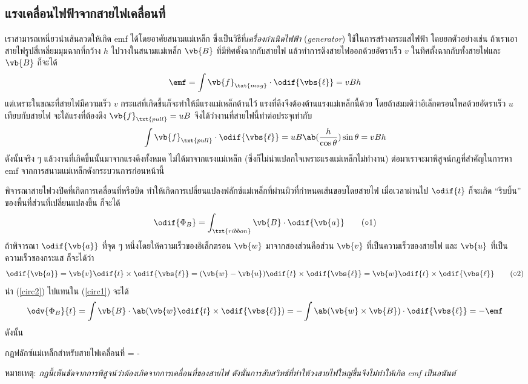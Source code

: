 \subsection{แรงเคลื่อนไฟฟ้าจากสายไฟเคลื่อนที่}

เราสามารถเหนี่ยวนำเส้นลวดให้เกิด emf ได้โดยอาศัยสนามแม่เหล็ก ซึ่งเป็นวิธีที่\emph{เครื่องกำเนิดไฟฟ้า} (\emph{generator}) ใช้ในการสร้างกระแสไฟฟ้า โดยยกตัวอย่างเช่น ถ้าเราเอาสายไฟรูปสี่เหลี่ยมมุมฉากที่กว้าง $h$ ไปวางในสนามแม่เหล็ก $\vb{B}$ ที่มีทิศตั้งฉากกับสายไฟ แล้วทำการดึงสายไฟออกด้วยอัตราเร็ว $v$ ในทิศตั้งฉากกับทั้งสายไฟและ $\vb{B}$ ก็จะได้
\[ 
\emf = \int \vb{f}_\txt{mag}\cdot\odif{\vbs{\ell}} = vBh 
\]
แต่เพราะในขณะที่สายไฟมีความเร็ว $v$ กระแสที่เกิดขึ้นก็จะทำให้มีแรงแม่เหล็กต้านไว้ แรงที่ดึงจึงต้องต้านแรงแม่เหล็กนี้ด้วย โดยถ้าสมมติว่าอิเล็กตรอนไหลด้วยอัตราเร็ว $u$ เทียบกับสายไฟ จะได้แรงที่ต้องดึง $\vb{f}_\txt{pull} = uB$ จึงได้ว่างานที่สายไฟนี้ทำต่อประจุเท่ากับ
\[ 
\int \vb{f}_\txt{pull}\cdot\odif{\vbs{\ell}} = uB\ab(\frac{h}{\cos\theta})\sin\theta = vBh 
\]
ดังนั้นจริง ๆ แล้วงานที่เกิดขึ้นนั้นมาจากแรงดึงทั้งหมด ไม่ได้มาจากแรงแม่เหล็ก (ซึ่งก็ไม่น่าแปลกใจเพราะแรงแม่เหล็กไม่ทำงาน) ต่อมาเราจะมาพิสูจน์กฎที่สำคัญในการหา emf จากการสนามแม่เหล็กดังกระบวนการก่อนหน้านี้

พิจารณาสายไฟวงปิดที่เกิดการเคลื่อนที่หรือบิด ทำให้เกิดการเปลี่ยนแปลงฟลักซ์แม่เหล็กที่ผ่านผิวที่กำหนดเส้นขอบโดยสายไฟ เมื่อเวลาผ่านไป $\odif{t}$ ก็จะเกิด ``ริบบิ้น'' ของพื้นที่ส่วนที่เปลี่ยนแปลงขึ้น ก็จะได้
\begin{equation} 
    \odif{\Phi_B} = \int_{\txt{ribbon}}\vb{B}\cdot\odif{\vb{a}}\tag{$\circ$1}\label{circ1} 
\end{equation}
ถ้าพิจารณา $\odif{\vb{a}}$ ที่จุด ๆ หนึ่งโดยให้ความเร็วของอิเล็กตรอน $\vb{w}$ มาจากสองส่วนคือส่วน $\vb{v}$ ที่เป็นความเร็วของสายไฟ และ $\vb{u}$ ที่เป็นความเร็วของกระแส ก็จะได้ว่า
\begin{equation} 
    \odif{\vb{a}} = \vb{v}\odif{t}\times\odif{\vbs{\ell}} = (\vb{w}-\vb{u})\odif{t}\times\odif{\vbs{\ell}} = \vb{w}\odif{t}\times\odif{\vbs{\ell}}\tag{$\circ$2}\label{circ2} 
\end{equation}
นำ (\ref{circ2}) ไปแทนใน (\ref{circ1}) จะได้
\[ 
\odv{\Phi_B}{t} = \int\vb{B}\cdot\ab(\vb{w}\odif{t}\times\odif{\vbs{\ell}}) = -\int\ab(\vb{w}\times\vb{B})\cdot\odif{\vbs{\ell}} = -\emf 
\]
ดังนั้น
\begin{ieqbox}{กฎฟลักซ์แม่เหล็กสำหรับสายไฟเคลื่อนที่} 
    \emf = -\label{motionalemf} 
\end{ieqbox}
หมายเหตุ: \emph{กฎนี้เห็นชัดจากการพิสูจน์ว่าต้องเกิดจากการเคลื่อนที่ของสายไฟ ดังนั้นการสับสวิทช์ที่ทำให้วงสายไฟใหญ่ขึ้นจึงไม่ทำให้เกิด emf เป็นอนันต์}

